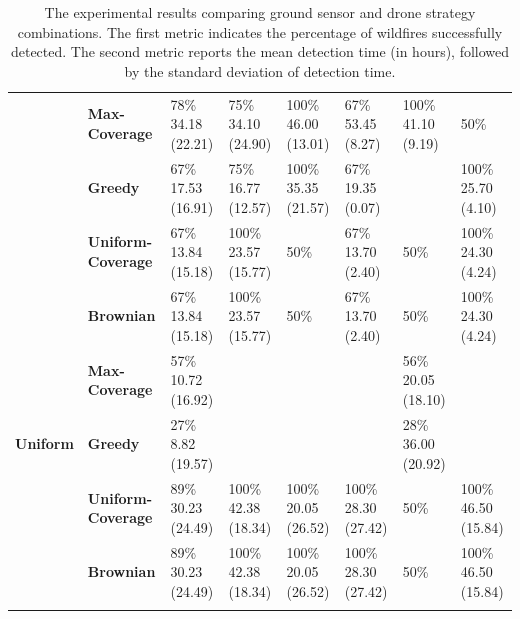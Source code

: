 \begin{small}
\begin{longtable}{p{1.8cm} |p{1.8cm} |p{1.1cm} |p{1.3cm} |p{1cm}| p{1cm}| p{1cm} |p{1cm}}
\addlinespace
\midrule
\endhead
\small
\multirow[t]{3}{*}{\textbf{Max-Coverage}} & \textbf{Max-Coverage} & 78\%
34.18 (22.21) & 75\%
34.10 (24.90) & 100\%
46.00 (13.01) & 67\%
53.45 (8.27) & 100\%
41.10 (9.19) & 50\%
 \\
\cmidrule{2-8}
 & \textbf{Greedy} & 67\%
17.53 (16.91) & 75\%
16.77 (12.57) & 100\%
35.35 (21.57) & 67\%
19.35 (0.07) &  & 100\%
25.70 (4.10) \\
\cmidrule{2-8}
 & \textbf{Uniform-Coverage} & 67\%
13.84 (15.18) & 100\%
23.57 (15.77) & 50\%
 & 67\%
13.70 (2.40) & 50\%
 & 100\%
24.30 (4.24) \\
\cmidrule{2-8}
 & \textbf{Brownian} & 67\%
13.84 (15.18) & 100\%
23.57 (15.77) & 50\%
 & 67\%
13.70 (2.40) & 50\%
 & 100\%
24.30 (4.24) \\
\midrule

\multirow[t]{3}{*}{\textbf{Uniform}} & \textbf{Max-Coverage} & 57\%
10.72 (16.92) & 
 & &
 & 56\%
20.05 (18.10)
 &  \\
\cmidrule{2-8}
 & \textbf{Greedy} 
& 27\%
8.82 (19.57) & & & & 28\%
36.00 (20.92) &  \\
\cmidrule{2-8}
 & \textbf{Uniform-Coverage} & 89\%
30.23 (24.49) & 100\%
42.38 (18.34) & 100\%
20.05 (26.52) & 100\%
28.30 (27.42) & 50\%
 & 100\%
46.50 (15.84) \\
\cmidrule{2-8}
 & \textbf{Brownian} & 89\%
30.23 (24.49) & 100\%
42.38 (18.34) & 100\%
20.05 (26.52) & 100\%
28.30 (27.42) & 50\%
 & 100\%
46.50 (15.84) \\


\bottomrule
\addlinespace %
\caption{The experimental results comparing ground sensor and drone strategy combinations. The first metric indicates the percentage of wildfires successfully detected. The second metric reports the mean detection time (in hours), followed by the standard deviation of detection time. }\label{tab:results}\\ 
\end{longtable}






\end{small}
